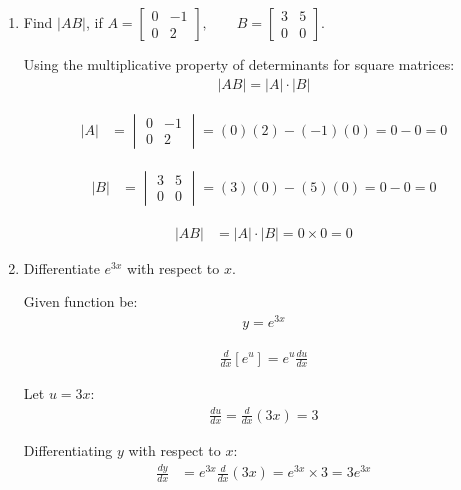 \begin{enumerate}[label=\thesubsection.\arabic*, ref=\thesubsection.\theenumi]
	
\item Find $|AB|$, if
$
A=\begin{bmatrix}0&-1\\0&2\end{bmatrix},
\qquad
B=\begin{bmatrix}3&5\\0&0\end{bmatrix}.
$

\solution
Using the multiplicative property of determinants for square matrices:
\begin{align*}
	|AB| = |A| \cdot |B|
\end{align*}

\begin{align*}
	|A| &= \begin{vmatrix} 0 & -1 \\ 0 & 2 \end{vmatrix} = (0)(2) - (-1)(0) = 0 - 0 = 0
\end{align*}

\begin{align*}
	|B| &= \begin{vmatrix} 3 & 5 \\ 0 & 0 \end{vmatrix} = (3)(0) - (5)(0) = 0 - 0 = 0
\end{align*}

\begin{align*}
	|AB| &= |A| \cdot |B| = 0 \times 0 = 0
\end{align*}


\item Differentiate $e^{3x}$ with respect to $x$.

\solution
Given function be:
\begin{align*}
	y = e^{3x}
\end{align*}

\begin{align*}
	\frac{d}{dx}[e^{u}] = e^u \frac{du}{dx}
\end{align*}

Let $u = 3x$:
\begin{align*}
	\frac{du}{dx} = \frac{d}{dx}(3x) = 3
\end{align*}

Differentiating $y$ with respect to $x$:
\begin{align*}
	\frac{dy}{dx} &= e^{3x} \frac{d}{dx}(3x) = e^{3x} \times 3 = 3e^{3x}
\end{align*}


\end{enumerate}
